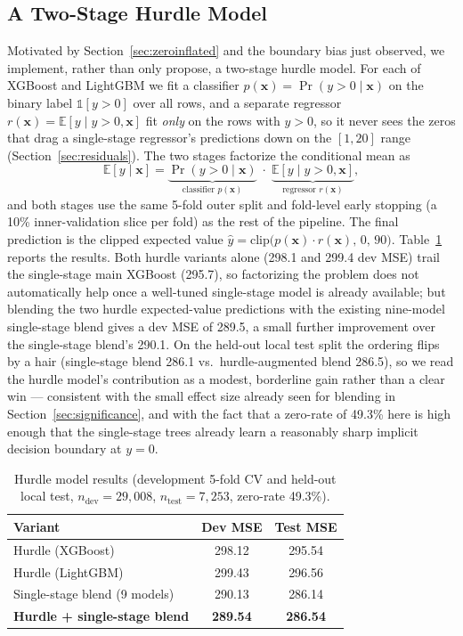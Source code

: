 \documentclass[journal]{IEEEtran}
\begin{document}
\subsection{A Two-Stage Hurdle Model}
\label{sec:hurdle-impl}
Motivated by Section~\ref{sec:zeroinflated} and the boundary bias just
observed, we implement, rather than only propose, a two-stage hurdle model.
For each of XGBoost and LightGBM we fit a classifier
$p(\mathbf{x})=\Pr(y>0\mid\mathbf{x})$ on the binary label $\mathbb{1}[y>0]$
over all rows, and a separate regressor
$r(\mathbf{x})=\mathbb{E}[y\mid y>0,\mathbf{x}]$ fit \emph{only} on the rows
with $y>0$, so it never sees the zeros that drag a single-stage regressor's
predictions down on the $[1,20]$ range (Section~\ref{sec:residuals}). The two
stages factorize the conditional mean as
\begin{equation}
\mathbb{E}[y\mid\mathbf{x}] = \underbrace{\Pr(y>0\mid\mathbf{x})}_{\text{classifier }p(\mathbf{x})}\;\cdot\;\underbrace{\mathbb{E}[y\mid y>0,\mathbf{x}]}_{\text{regressor }r(\mathbf{x})},
\label{eq:hurdle}
\end{equation}
and both stages use the same 5-fold outer split and fold-level early stopping
(a 10\% inner-validation slice per fold) as the rest of the pipeline. The final
prediction is the clipped expected value
$\hat y=\mathrm{clip}\big(p(\mathbf{x})\cdot r(\mathbf{x}),\,0,\,90\big)$.
Table~\ref{tab:hurdle} reports the results. Both
hurdle variants alone (298.1 and 299.4 dev MSE) trail the single-stage
main XGBoost (295.7), so factorizing the problem does not automatically help
once a well-tuned single-stage model is already available; but blending the two
hurdle expected-value predictions with the existing nine-model single-stage
blend gives a dev MSE of 289.5, a small further improvement over the
single-stage blend's 290.1. On the held-out local test split the ordering
flips by a hair (single-stage blend 286.1 vs.\ hurdle-augmented blend
286.5), so we read the hurdle model's contribution as a modest, borderline
gain rather than a clear win --- consistent with the small effect size already
seen for blending in Section~\ref{sec:significance}, and with the fact that a
zero-rate of 49.3\% here is high enough that the single-stage trees already
learn a reasonably sharp implicit decision boundary at $y=0$.

\begin{table}[!t]
\caption{Hurdle model results (development 5-fold CV and held-out local test,
$n_{\text{dev}}=29{,}008$, $n_{\text{test}}=7{,}253$, zero-rate 49.3\%).}
\label{tab:hurdle}
\centering
\begin{tabular}{lcc}
\toprule
Variant & Dev MSE & Test MSE \\
\midrule
Hurdle (XGBoost) & 298.12 & 295.54 \\
Hurdle (LightGBM) & 299.43 & 296.56 \\
Single-stage blend (9 models) & 290.13 & 286.14 \\
\textbf{Hurdle + single-stage blend} & \textbf{289.54} & \textbf{286.54} \\
\bottomrule
\end{tabular}
\end{table}
\end{document}

